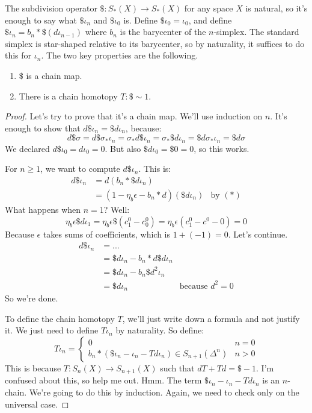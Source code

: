 The subdivision operator $\$:S_\ast(X)\to S_\ast(X)$ for any space $X$ is natural, so it's enough to say what $\$\iota_n$ and $\$\iota_0$ is. Define $\$\iota_0=\iota_0$, and define $\$\iota_n=b_n\ast\$(d\iota_{n-1})$ where $b_n$ is the barycenter of the $n$-simplex. The standard simplex is star-shaped relative to its barycenter, so by naturality, it suffices to do this for $\iota_n$. The two key properties are the following.
\begin{theorem}
\begin{enumerate}
\item $\$$ is a chain map.
\item There is a chain homotopy $T:\$\sim 1$.
\end{enumerate}
\end{theorem}
\begin{proof}
Let's try to prove that it's a chain map. We'll use induction on $n$. It's enough to show that $d\$\iota_n=\$ d\iota_n$, because:$$d\$\sigma=d\$\sigma_\ast\iota_n=\sigma_\ast d\$\iota_n=\sigma_\ast \$d\iota_n=\$ d\sigma_\ast\iota_n=\$ d\sigma$$
We declared $d\$\iota_0=d\iota_0=0$. But also $\$d\iota_0=\$0=0$, so this works.

For $n\geq 1$, we want to compute $d\$\iota_n$. This is:
\begin{align*}
d\$\iota_n & =d(b_n\ast \$ d\iota_n) & \\
 & = (1-\eta_b\epsilon-b_n\ast d)(\$ d\iota_n) & \text{by $(\ast)$}
\end{align*}
What happens when $n=1$? Well:
$$\eta_b\epsilon\$d\iota_1 = \eta_b\epsilon \$(c^0_1 - c^0_0)=\eta_b\epsilon(c^0_1 - c^0-0)=0$$
Because $\epsilon$ takes sums of coefficients, which is $1+(-1)=0$. Let's continue.
\begin{align*}
d\$\iota_n & = ... & \\
 & = \$d\iota_n - b_n\ast d\$ d\iota_n & \\
 & = \$d\iota_n - b_n\$d^2\iota_n &\\
 & = \$d\iota_n & \text{because $d^2=0$}
\end{align*}
So we're done.

To define the chain homotopy $T$, we'll just write down a formula and not justify it. We just need to define $T\iota_n$ by naturality. So define:
\begin{equation*}
T\iota_n = \begin{cases}
0 & n=0\\
b_{n}\ast(\$\iota_n - \iota_n- Td\iota_n)\in S_{n+1}(\Delta^n) & n>0
\end{cases}
\end{equation*}
This is because $T:S_n(X)\to S_{n+1}(X)$ such that $dT+Td=\$-1$. I'm confused about this, so help me out. Hmm. The term $\$\iota_n - \iota_n-Td\iota_n$ is an $n$-chain. We're going to do this by induction. Again, we need to check only on the universal case.


\end{proof}
